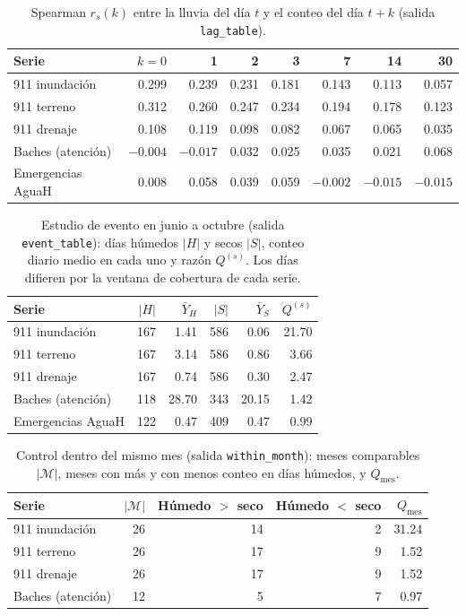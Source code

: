 \documentclass[11pt]{article}
\newcommand{\cod}[1]{\nolinkurl{#1}}
\begin{document}
\begin{table}[!htbp]
  \centering
  \small
  \caption{Spearman $r_s(k)$ entre la lluvia del día $t$ y el conteo del día $t+k$ (salida \cod{lag_table}).}
  \label{tab:e2-lags}
  \begin{tabular}{lrrrrrrr}
    \toprule
    Serie & $k=0$ & 1 & 2 & 3 & 7 & 14 & 30 \\
    \midrule
    911 inundación & 0.299 & 0.239 & 0.231 & 0.181 & 0.143 & 0.113 & 0.057 \\
    911 terreno & 0.312 & 0.260 & 0.247 & 0.234 & 0.194 & 0.178 & 0.123 \\
    911 drenaje & 0.108 & 0.119 & 0.098 & 0.082 & 0.067 & 0.065 & 0.035 \\
    Baches (atención) & $-0.004$ & $-0.017$ & 0.032 & 0.025 & 0.035 & 0.021 & 0.068 \\
    Emergencias AguaH & 0.008 & 0.058 & 0.039 & 0.059 & $-0.002$ & $-0.015$ & $-0.015$ \\
    \bottomrule
  \end{tabular}
\end{table}

\begin{table}[!htbp]
  \centering
  \small
  \caption{Estudio de evento en junio a octubre (salida \cod{event_table}): días húmedos $|H|$ y secos $|S|$, conteo diario medio en cada uno y razón $Q^{(s)}$. Los días difieren por la ventana de cobertura de cada serie.}
  \label{tab:e2-evento}
  \begin{tabular}{lrrrrr}
    \toprule
    Serie & $|H|$ & $\bar{Y}_H$ & $|S|$ & $\bar{Y}_S$ & $Q^{(s)}$ \\
    \midrule
    911 inundación & 167 & 1.41 & 586 & 0.06 & 21.70 \\
    911 terreno & 167 & 3.14 & 586 & 0.86 & 3.66 \\
    911 drenaje & 167 & 0.74 & 586 & 0.30 & 2.47 \\
    Baches (atención) & 118 & 28.70 & 343 & 20.15 & 1.42 \\
    Emergencias AguaH & 122 & 0.47 & 409 & 0.47 & 0.99 \\
    \bottomrule
  \end{tabular}
\end{table}

\begin{table}[!htbp]
  \centering
  \small
  \caption{Control dentro del mismo mes (salida \cod{within_month}): meses comparables $|\mathcal{M}|$, meses con más y con menos conteo en días húmedos, y $Q_{\text{mes}}$.}
  \label{tab:e2-mes}
  \begin{tabular}{lrrrr}
    \toprule
    Serie & $|\mathcal{M}|$ & Húmedo $>$ seco & Húmedo $<$ seco & $Q_{\text{mes}}$ \\
    \midrule
    911 inundación & 26 & 14 & 2 & 31.24 \\
    911 terreno & 26 & 17 & 9 & 1.52 \\
    911 drenaje & 26 & 17 & 9 & 1.52 \\
    Baches (atención) & 12 & 5 & 7 & 0.97 \\
    \bottomrule
  \end{tabular}
\end{table}
\end{document}
